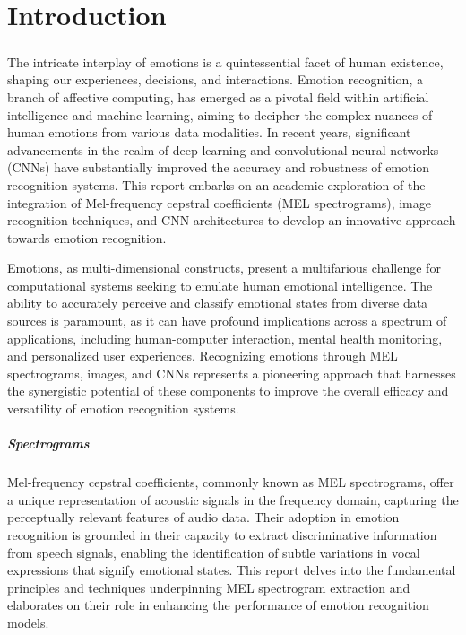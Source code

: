 \chapter{Introduction}

\paragraph{}
The intricate interplay of emotions is a quintessential facet of human existence, shaping our experiences, decisions, and interactions. Emotion recognition, a branch of affective computing, has emerged as a pivotal field within artificial intelligence and machine learning, aiming to decipher the complex nuances of human emotions from various data modalities. In recent years, significant advancements in the realm of deep learning and convolutional neural networks (CNNs) have substantially improved the accuracy and robustness of emotion recognition systems. This report embarks on an academic exploration of the integration of Mel-frequency cepstral coefficients (MEL spectrograms), image recognition techniques, and CNN architectures to develop an innovative approach towards emotion recognition.

Emotions, as multi-dimensional constructs, present a multifarious challenge for computational systems seeking to emulate human emotional intelligence. The ability to accurately perceive and classify emotional states from diverse data sources is paramount, as it can have profound implications across a spectrum of applications, including human-computer interaction, mental health monitoring, and personalized user experiences. Recognizing emotions through MEL spectrograms, images, and CNNs represents a pioneering approach that harnesses the synergistic potential of these components to improve the overall efficacy and versatility of emotion recognition systems.

\paragraph{Spectrograms}
Mel-frequency cepstral coefficients, commonly known as MEL spectrograms, offer a unique representation of acoustic signals in the frequency domain, capturing the perceptually relevant features of audio data. Their adoption in emotion recognition is grounded in their capacity to extract discriminative information from speech signals, enabling the identification of subtle variations in vocal expressions that signify emotional states. This report delves into the fundamental principles and techniques underpinning MEL spectrogram extraction and elaborates on their role in enhancing the performance of emotion recognition models.

